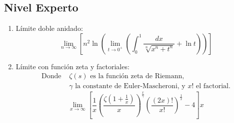 \documentclass[10pt,a4paper]{article}
\newcommand{\eulerGamma}{\gamma} %
\newcommand{\riemannZeta}{\zeta} %
\begin{document}
	\subsection*{Nivel Experto}
	
	\begin{enumerate}
		\item Límite doble anidado:
		\[
		\lim_{n \to \infty} \left[ n^2 \ln \left( \lim_{t \to 0^+} \left( \int_0^1 \frac{dx}{\sqrt[n]{x^n + t^n}} + \ln t \right) \right) \right]
		\]
		
		\item Límite con función zeta y factoriales: 
		\begin{align*}
			\text{Donde } & \riemannZeta(s) \text{ es la función zeta de Riemann,} \\
			& \eulerGamma \text{ la constante de Euler-Mascheroni, y } x! \text{ el factorial.}
		\end{align*}
		\[
		\lim_{x \to \infty} \left[ \frac{1}{x} \left( \frac{\riemannZeta(1 + \frac{1}{x})}{x} \right)^{\frac{x}{\eulerGamma}} \left( \frac{(2x)!}{x!} \right)^{\frac{1}{x}} - 4 \right] x
		\]
	\end{enumerate}
	
\end{document}
